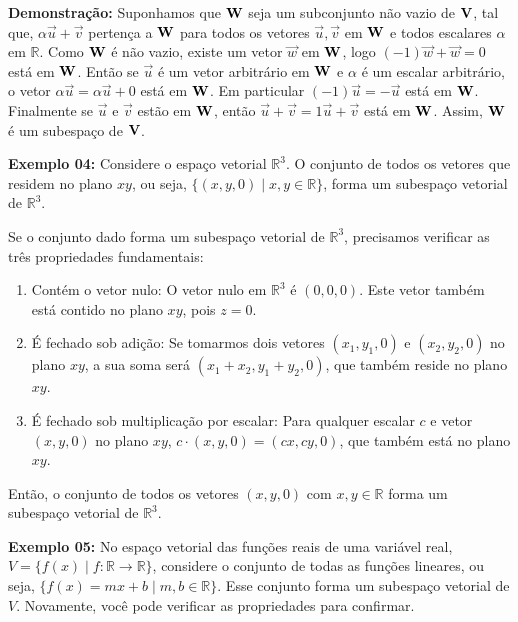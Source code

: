 \noindent\textbf{Demonstração:} Suponhamos que $\vb{W}$ seja um subconjunto não vazio de $\vb{V}$, tal que, $\alpha\vec{u} + \vec{v}$ pertença a $\vb{W}$ para todos os vetores $\vec{u}, \vec{v}$ em $\vb{W}$ e todos escalares $\alpha$ em $\mathbb{R}$. Como $\vb{W}$ é não vazio, existe um vetor $\vec{w}$ em $\vb{W}$, logo $(-1) \vec{w} + \vec{w} = 0$ está em $\vb{W}$. Então se $\vec{u}$ é um vetor arbitrário em $\vb{W}$ e $\alpha$ é um escalar arbitrário, o vetor $\alpha\vec{u} = \alpha\vec{u} + 0$ está em $\vb{W}$. Em particular $(-1)\vec{u} = -\vec{u}$ está em $\vb{W}$. Finalmente se $\vec{u}$ e $\vec{v}$ estão em $\vb{W}$, então $\vec{u} + \vec{v} = 1\vec{u} + \vec{v}$ está em $\vb{W}$.
Assim, $\vb{W}$ é um subespaço de $\vb{V}$. \nocite{hoffman1979}

\noindent\textbf{Exemplo 04:} Considere o espaço vetorial $\mathbb{R}^3$. O conjunto de todos os vetores que residem no plano $xy$, ou seja, $\{(x, y, 0) \mid x, y \in \mathbb{R}\}$, forma um subespaço vetorial de $\mathbb{R}^3$.

Se o conjunto dado forma um subespaço vetorial de $\mathbb{R}^3$, precisamos verificar as três propriedades fundamentais:

\begin{enumerate}
	\item Contém o vetor nulo: O vetor nulo em $\mathbb{R}^3$ é $(0,0,0)$. Este vetor também está contido no plano $xy$, pois $z = 0$.

	\item É fechado sob adição: Se tomarmos dois vetores $(x_1, y_1, 0)$ e $(x_2, y_2, 0)$ no plano $xy$, a sua soma será $(x_1 + x_2, y_1 + y_2, 0)$, que também reside no plano $xy$.

	\item É fechado sob multiplicação por escalar: Para qualquer escalar $c$ e vetor $(x, y, 0)$ no plano $xy$, $c \cdot (x, y, 0) = (cx, cy, 0)$, que também está no plano $xy$.
\end{enumerate}

Então, o conjunto de todos os vetores $(x, y, 0)$ com $x, y \in \mathbb{R}$ forma um subespaço vetorial de $\mathbb{R}^3$.

\noindent\textbf{Exemplo 05:} No espaço vetorial das funções reais de uma variável real, $V = \{f(x) \mid f: \mathbb{R} \rightarrow \mathbb{R}\}$, considere o conjunto de todas as funções lineares, ou seja, $\{f(x) = mx + b \mid m, b \in \mathbb{R}\}$. Esse conjunto forma um subespaço vetorial de $V$. Novamente, você pode verificar as propriedades para confirmar.

